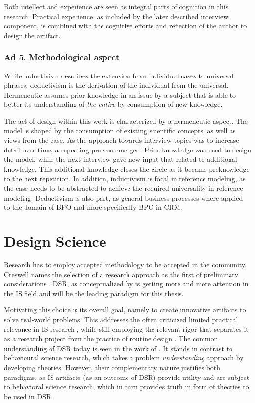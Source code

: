Both intellect and experience are seen as integral parts of cognition in this research. Practical experience, as included by the later described interview component, is combined with the cognitive efforts and reflection of the author to design the artifact. 

\subsubsection{Ad 5. Methodological aspect}
While inductivism describes the extension from individual cases to universal phrases, deductivism is the derivation of the individual from the universal. Hermeneutic assumes prior knowledge in an issue by a subject that is able to better its understanding of \textit{the entire} by consumption of new knowledge. 

The act of design within this work is characterized by a hermeneutic aspect. The model is shaped by the consumption of existing scientific concepts, as well as views from the case. As the approach towards interview topics was to increase detail over time, a repeating process emerged: Prior knowledge was used to design the model, while the next interview gave new input that related to additional knowledge. This additional knowledge closes the circle as it became preknowledge to the next repetition. In addition, inductivism is focal in reference modeling, as the case needs to be abstracted to achieve the required universality in reference modeling. Deductivism is also part, as general business processes where applied to the domain of BPO and more specifically BPO in CRM.  


\section{Design Science}
Research has to employ accepted methodology to be accepted in the community. Creswell names the selection of a research approach as the first of preliminary considerations \cite{creswell2013research}. \acrfull{DSR}, as conceptualized by \cite{simon1996sciences} is getting more and more attention in the \acrshort{IS} field and will be the leading paradigm for this thesis. 

Motivating this choice is its overall goal, namely to create innovative artifacts to solve real-world problems. This addresses the often criticized limited practical relevance in \acrshort{IS} research \cite{hirschheim}, while still employing the relevant rigor that separates it as a research project from the practice of routine design \cite{Winter2008Hevner}. The common understanding of \acrshort{DSR} today is seen in the work of \cite{Hevner2004}. It stands in contrast to behavioural science research, which takes a problem \textit{understanding} approach by developing theories. However, their complementary nature justifies both paradigms, as IS artifacts (as an outcome of \acrshort{DSR}) provide utility and are subject to behavioral science research, which in turn provides truth in form of theories to be used in \acrshort{DSR}.

